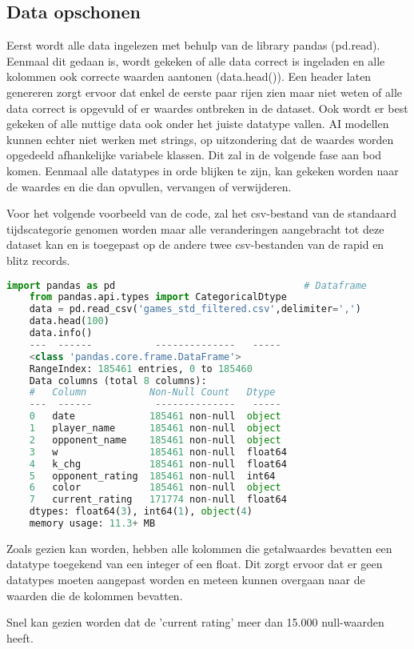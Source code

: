 \subsection{Data opschonen}

Eerst wordt alle data ingelezen met behulp van de library pandas (pd.read). Eenmaal dit gedaan is, wordt gekeken of alle data correct is ingeladen en alle kolommen ook correcte waarden aantonen (data.head()). Een header laten genereren zorgt ervoor dat enkel de eerste paar rijen zien maar niet weten of alle data correct is opgevuld of er waardes ontbreken in de dataset. Ook wordt er best gekeken of alle nuttige data ook onder het juiste datatype vallen. AI modellen kunnen echter niet werken met strings, op uitzondering dat de waardes worden opgedeeld afhankelijke variabele klassen. Dit zal in de volgende fase aan bod komen. Eenmaal alle datatypes in orde blijken te zijn, kan gekeken worden naar de waardes en die dan opvullen, vervangen of verwijderen. 

Voor het volgende voorbeeld van de code, zal het csv-bestand van de standaard tijdscategorie genomen worden maar alle veranderingen aangebracht tot deze dataset kan en is toegepast op de andere twee csv-bestanden van de rapid en blitz records.

\begin{lstlisting}[language=Python]
    import pandas as pd                                 # Dataframe
    from pandas.api.types import CategoricalDtype
    data = pd.read_csv('games_std_filtered.csv',delimiter=',')
    data.head(100)
    data.info()
    ---  ------           --------------   -----  
    <class 'pandas.core.frame.DataFrame'>
    RangeIndex: 185461 entries, 0 to 185460
    Data columns (total 8 columns):
    #   Column           Non-Null Count   Dtype  
    ---  ------           --------------   -----  
    0   date             185461 non-null  object 
    1   player_name      185461 non-null  object 
    2   opponent_name    185461 non-null  object 
    3   w                185461 non-null  float64
    4   k_chg            185461 non-null  float64
    5   opponent_rating  185461 non-null  int64  
    6   color            185461 non-null  object 
    7   current_rating   171774 non-null  float64
    dtypes: float64(3), int64(1), object(4)
    memory usage: 11.3+ MB
\end{lstlisting}

Zoals gezien kan worden, hebben alle kolommen die getalwaardes bevatten een datatype toegekend van een integer of een float. Dit zorgt ervoor dat er geen datatypes moeten aangepast worden en meteen kunnen overgaan naar de waarden die de kolommen bevatten.

Snel kan gezien worden dat de 'current rating' meer dan 15.000 null-waarden heeft.